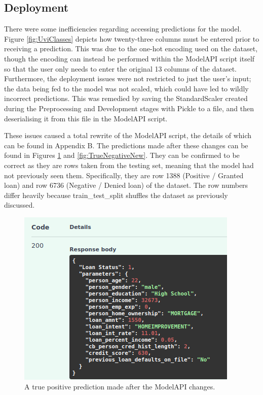 \documentclass[12pt]{report}
\newcommand{\para}{\vspace{7pt}\noindent}
\begin{document}

\subsection{Deployment}

There were some inefficiencies regarding accessing predictions for the model. Figure \ref{fig:UviClasses} depicts how twenty-three
columns must be entered prior to receiving a prediction. This was due to the one-hot encoding used on the dataset, though the encoding
can instead be performed within the ModelAPI script itself so that the user only needs to enter the original 13 columns of the dataset.
Furthermore, the deployment issues were not restricted to just the user's input; the data being fed to the model was not scaled,
which could have led to wildly incorrect predictions. This was remedied by saving the StandardScaler created during the Preprocessing 
and Development stages with Pickle to a file, and then deserialising it from this file in the ModelAPI script.

\para These issues caused a total rewrite of the ModelAPI script, the details of which can be found in Appendix B. The predictions 
made after these changes can be found in Figures \ref{fig:TruePositiveNew} and \ref{fig:TrueNegativeNew}. They can be confirmed to 
be correct as they are rows taken from the testing set, meaning that the model had not previously seen them. Specifically, they are 
row 1388 (Positive / Granted loan) and row 6736 (Negative / Denied loan) of the dataset.
The row numbers differ heavily because train\_test\_split shuffles the dataset as previously discussed.

\begin{figure}[H]
    \centering
    \includegraphics[width=.75\linewidth]{Implementation/JAN 10 UPDATES/NewTruePositiveOutput.png}
    \caption{A true positive prediction made after the ModelAPI changes.}
    \label{fig:TruePositiveNew}
\end{figure}
\end{document}
